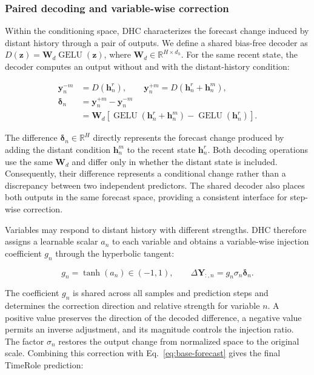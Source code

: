 \subsubsection{Paired decoding and variable-wise correction}

Within the conditioning space, DHC characterizes the forecast change induced by distant history through a pair of outputs. We define a shared bias-free decoder as \(D(\mathbf z)=\mathbf W_d\operatorname{GELU}(\mathbf z)\), where \(\mathbf{W}_{d}\in\mathbb{R}^{H\times d_h}\). For the same recent state, the decoder computes an output without and with the distant-history condition:

\begin{equation}
\begin{aligned}
\mathbf{y}^{-m}_{n}
&=D(\mathbf{h}^{r}_{n}),\qquad
\mathbf{y}^{+m}_{n}=D(\mathbf{h}^{r}_{n}+\mathbf{h}^{m}_{n}),
\\
\boldsymbol{\delta}_{n}
&=\mathbf{y}^{+m}_{n}-\mathbf{y}^{-m}_{n}\\
&=\mathbf W_d\!\left[
\operatorname{GELU}(\mathbf h_n^r+\mathbf h_n^m)
-\operatorname{GELU}(\mathbf h_n^r)
\right].
\end{aligned}
\label{eq:paired-decoding}
\end{equation}

The difference \(\boldsymbol{\delta}_{n}\in\mathbb{R}^{H}\) directly represents the forecast change produced by adding the distant condition \(\mathbf{h}^{m}_{n}\) to the recent state \(\mathbf{h}^{r}_{n}\). Both decoding operations use the same \(\mathbf W_d\) and differ only in whether the distant state is included. Consequently, their difference represents a conditional change rather than a discrepancy between two independent predictors. The shared decoder also places both outputs in the same forecast space, providing a consistent interface for step-wise correction.

Variables may respond to distant history with different strengths. DHC therefore assigns a learnable scalar \(a_n\) to each variable and obtains a variable-wise injection coefficient \(g_n\) through the hyperbolic tangent:

\begin{equation}
g_n=\tanh(a_n)\in(-1,1),\qquad
\Delta\mathbf{Y}_{:,n}
=g_n\sigma_n\boldsymbol{\delta}_{n}.
\label{eq:bounded-correction}
\end{equation}

The coefficient \(g_n\) is shared across all samples and prediction steps and determines the correction direction and relative strength for variable \(n\). A positive value preserves the direction of the decoded difference, a negative value permits an inverse adjustment, and its magnitude controls the injection ratio. The factor \(\sigma_n\) restores the output change from normalized space to the original scale. Combining this correction with Eq.~\eqref{eq:base-forecast} gives the final TimeRole prediction:

